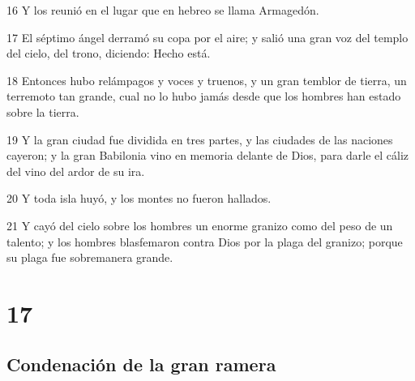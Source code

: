 \par 16 Y los reunió en el lugar que en hebreo se llama Armagedón.
\par 17 El séptimo ángel derramó su copa por el aire; y salió una gran voz del templo del cielo, del trono, diciendo: Hecho está.
\par 18 Entonces hubo relámpagos y voces y truenos, y un gran temblor de tierra, un terremoto tan grande, cual no lo hubo jamás desde que los hombres han estado sobre la tierra.
\par 19 Y la gran ciudad fue dividida en tres partes, y las ciudades de las naciones cayeron; y la gran Babilonia vino en memoria delante de Dios, para darle el cáliz del vino del ardor de su ira.
\par 20 Y toda isla huyó, y los montes no fueron hallados.
\par 21 Y cayó del cielo sobre los hombres un enorme granizo como del peso de un talento; y los hombres blasfemaron contra Dios por la plaga del granizo; porque su plaga fue sobremanera grande.

\chapter{17}

\section*{Condenación de la gran ramera}

